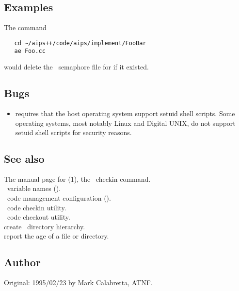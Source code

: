 \subsection*{Examples}

The command

\begin{verbatim}
   cd ~/aips++/code/aips/implement/FooBar
   ae Foo.cc
\end{verbatim}

\noindent
would delete the \rcs\ semaphore file for  if it existed.

\subsection*{Bugs}

\begin{itemize}
\item
    requires that the host operating system support setuid shell
   scripts.  Some operating systems, most notably Linux and Digital
   UNIX, do not support setuid shell scripts for security reasons.
\end{itemize}

\subsection*{See also}

The manual page for (1), the \rcs\ checkin command.\\
\aipspp\ variable names ().\\
\aipspp\ code management configuration ().\\
 \aipspp\ code checkin utility.\\
 \aipspp\ code checkout utility.\\
 create \aipspp\ directory hierarchy.\\
 report the age of a file or directory.

\subsection*{Author}

Original: 1995/02/23 by Mark Calabretta, ATNF.


\newpage
\section{}
\label{ai}


